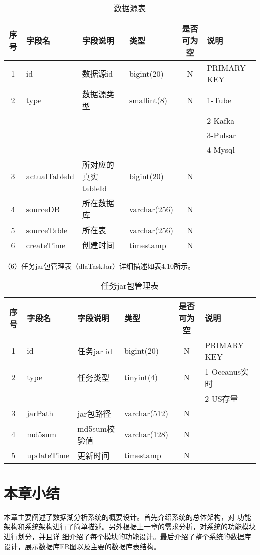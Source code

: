 \begin{table}[h]
  \centering
  \caption{数据源表}
  \label{tab:exampletable}
  \begin{tabular}{clllcl}
    \toprule
    序号  & 字段名              & 字段说明           & 类型           & 是否可为空   & 说明  \\
    \midrule
    1    & id                 & 数据源id           & bigint(20)    & N          & PRIMARY KEY    \\
    2    & type               & 数据源类型          & smallint(8)   & N          & 1-Tube   \\
         &                    &                   &               &            & 2-Kafka  \\
         &                    &                   &               &            & 3-Pulsar  \\
         &                    &                   &               &            & 4-Mysql  \\
    3    & actualTableId      & 所对应的真实tableId  & bigint(20)   & N          &   \\
    4    & sourceDB           & 所在数据库          & varchar(256)  & N          &   \\
    5    & sourceTable        & 所在表             & varchar(256)  & N          &   \\
    6    & createTime         & 创建时间           & timestamp     & N          &    \\
    \bottomrule
  \end{tabular}
\end{table}

（6）任务jar包管理表（dlaTaskJar）详细描述如表4.10所示。

\begin{table}[h]
  \centering
  \caption{任务jar包管理表}
  \label{tab:exampletable}
  \begin{tabular}{clllcl}
    \toprule
    序号  & 字段名              & 字段说明           & 类型           & 是否可为空   & 说明  \\
    \midrule
    1    & id                 & 任务jar id        & bigint(20)     & N          & PRIMARY KEY    \\
    2    & type               & 任务类型           & tinyint(4)    & N           & 1-Oceanus实时   \\
         &                    &                   &               &            & 2-US存量   \\
    3    & jarPath            & jar包路径         & varchar(512)   & N          &   \\
    4    & md5sum             & md5sum校验值      & varchar(128)   & N          &   \\
    5    & updateTime         & 更新时间           & timestamp     & N          &   \\
    \bottomrule
  \end{tabular}
\end{table}

\section{本章小结}

本章主要阐述了数据湖分析系统的概要设计。首先介绍系统的总体架构，对
功能架构和系统架构进行了简单描述。另外根据上一章的需求分析，对系统的功能模块进行划分，并且详
细介绍了每个模块的功能设计。最后介绍了整个系统的数据库设计，展示数据库ER图以及主要的数据库表结构。

